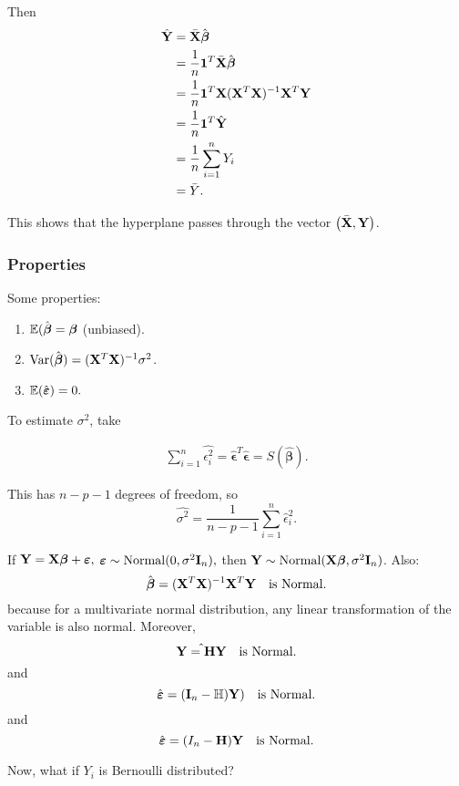 Then 
\begin{align*}
	\hat{\mathbf Y} &=\bar{\mathbf X}\hat{{\boldsymbol{\beta}}} \\
	&= \frac{1}{n} \mathbf 1^T \bar{\mathbf X} \hat{{\boldsymbol{\beta}}}\\
	&= \frac{1}{n}\mathbf 1^T\mathbf X (\mathbf X^T\mathbf X)^{-1}\mathbf X^T\mathbf Y  \\
	&= \frac{1}{n} \mathbf 1^T \hat{\mathbf Y} \\
	&= \frac{1}{n}\sum^{n}_{i=1} Y_i \\
	&=\bar{Y}
.\end{align*}

This shows that the hyperplane passes through the vector $\left(\bar{\mathbf X}, \mathbf Y \right) $.


\subsubsection{Properties }
Some properties:
\begin{enumerate}
	\item $\mathbb E(\hat{\boldsymbol{\beta}}=\boldsymbol \beta$ (unbiased).
	\item $\operatorname*{Var}(\hat{\boldsymbol\beta})=(\mathbf X^T\mathbf X)^{-1}\sigma^2$.
	\item $\mathbb E(\hat{\boldsymbol {\varepsilon}})=0.$
\end{enumerate}

To estimate $\sigma^2$, take

\begin{align*}
	\sum^n_{i=1}\hat{\epsilon_i^2} = \hat{\boldsymbol \epsilon}^T \hat{\boldsymbol \epsilon}=S(\hat{\boldsymbol \beta}) 
.\end{align*}

This has $n-p-1$ degrees of freedom, so
\[
	\hat{\sigma^2} = \frac{1}{n-p-1} \sum^n_{i=1}\hat{\epsilon}_i^2
.\] 
\begin{eg}
If $\mathbf Y=\mathbf X\boldsymbol {{\boldsymbol{\beta}}}+\boldsymbol {\varepsilon},$ $\boldsymbol {\varepsilon} \sim \operatorname*{Normal}(0,\sigma^2\mathbf I_n),$ then $\mathbf Y\sim\operatorname*{Normal}(\mathbf X{\boldsymbol{\beta}},\sigma^2\mathbf I_n)$. Also:
\[
	\hat{{\boldsymbol{\beta}}}=(\mathbf X^T\mathbf X)^{-1}\mathbf X^T\mathbf Y \quad \text{is Normal}
.\] 
because for a multivariate normal distribution, any linear transformation of the variable is also normal. Moreover,
\[
\hat{\mathbf Y=\mathbf{H}\mathbf Y} \quad \text{is Normal}
.\] 
and 
\[
\hat{\boldsymbol {\varepsilon}} =(\mathbf I_n-\mathbb{H})\mathbf Y) \quad \text{is Normal}
.\] 
and
\[
\hat{{\boldsymbol{\varepsilon}}} = (I_n-\mathbf H)\mathbf Y \quad \text{is Normal}
.\] 
\end{eg}

Now, what if $Y_i$ is Bernoulli distributed? 

